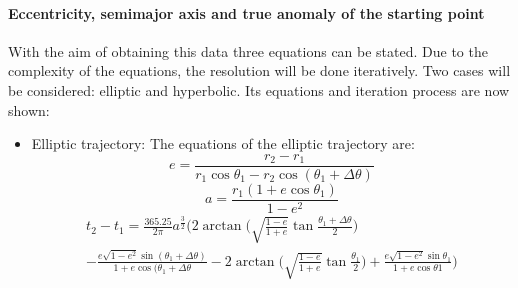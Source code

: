 \paragraph{Eccentricity, semimajor axis and true anomaly of the starting point}
With the aim of obtaining this data three equations can be stated. Due to the complexity of the equations, the resolution will be done iteratively. Two cases will be considered: elliptic and hyperbolic. Its equations and iteration process are now shown: 
\begin{itemize}
\item Elliptic trajectory:
The equations of the elliptic trajectory are: 
\begin{equation}
e=\frac{r_2-r_1}{r_1\cos\theta _1-r_2\cos(\theta_1+\Delta\theta)}
\end{equation}
\begin{equation}
a=\frac{r_1\left(1+e\cos\theta _1\right)}{1-e^2}
\end{equation}
\begin{multline}
t_2-t_1=\frac{365.25}{2\pi}a^\frac{3}{2}\Bigg(2\arctan\bigg(\sqrt{\frac{1-e}{1+e}}\tan\frac{\theta _1 +\Delta\theta}{2}\bigg)\\-\frac{e\sqrt{1-e^2}\sin (\theta _1+\Delta\theta)}{1+e\cos (\theta _1+\Delta\theta}-2\arctan\bigg(\sqrt{\frac{1-e}{1+e}}\tan \frac{\theta _1}{2}\bigg)+\frac{e\sqrt{1-e^2}\sin \theta _1}{1+e\cos \theta1}\Bigg)
\end{multline}


\end{itemize}

